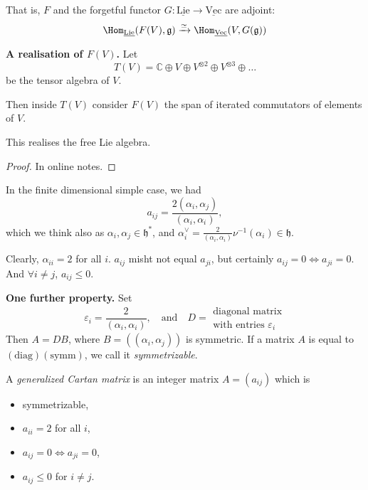 That is, $F$ and the 
forgetful functor $G:\underline{\text{Lie}}\to \underline{\text{Vec}}$
are adjoint:
$$
\Hom_{\underline{\text{Lie}}}(F(V),\mathfrak{g})
\xrightarrow{\simeq }
\Hom_{\underline{\text{Vec}}}(V,G(\mathfrak{g}))
$$

\medskip\noindent
{\bf A realisation of $F(V)$.} Let 
$$
T(V)=\mathbb{C} \oplus V \oplus V^{\otimes 2}\oplus V^{\otimes 3}\oplus\ldots
$$
be the tensor algebra of $V$. 

Then inside $T(V)$ consider $F(V)$ the span of iterated commutators of elements
of  $V$.

\begin{proposition}
\label{proposition-this-realises-the-free-Lie-algebra}
This realises the free Lie algebra.
\end{proposition}

\begin{proof}
In online notes.
\end{proof}

\medskip\noindent
In the finite dimensional simple case, we had
$$
a_{ij}=\frac{2(\alpha_i,\alpha_j)}{(\alpha_i,\alpha_i)},
$$
which we think also as $\alpha_i,\alpha_j \in \mathfrak{h}^*$, 
and $\alpha_i^\vee=\frac{2}{(\alpha_i,\alpha_i)}\nu^{-1}(\alpha_i) 
\in \mathfrak{h}.$

Clearly, $\alpha_{ii}=2$ for all $i$. 
$a_{ij}$ misht not equal $a_{ji}$, but certainly $a_{ij}=0 \iff a_{ji}=0$. 
And $\forall  i \neq j$, $a_{ij} \leq 0$.

\medskip\noindent
{\bf One further property.} Set
$$
\varepsilon_i=\frac{2}{(\alpha_i,\alpha_i)},\quad \text{and}\quad 
D=\substack{\text{diagonal matrix} \\ \text{with entries }\varepsilon_i}
$$
Then $A=DB$, where $B=((\alpha_i,\alpha_j))$ is symmetric. 
If a matrix $A$ is equal to $(\text{diag})(\text{symm})$, we call it
 {\it symmetrizable}.

\begin{definition}
\label{definition-generalized-Cartan-matrix}
A {\it generalized Cartan matrix} is an integer matrix $A=(a_{ij})$ 
which is
\begin{itemize}
\item symmetrizable,
\item $a_{ii}=2$ for all $i$,
\item $a_{ij}=0 \iff a_{ji}=0$,
\item $a_{ij}\leq 0$ for $i \neq j$.
\end{itemize}
\end{definition}

